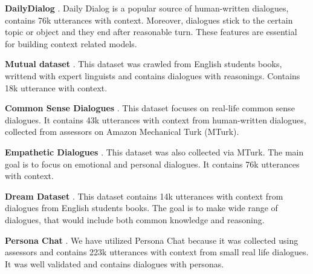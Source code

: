 \documentclass[11pt]{article}
\begin{document}
\textbf{DailyDialog} \cite{Li-Su-2017}. Daily Dialog is a popular source of human-written dialogues, contains 76k utterances with context. Moreover, dialogues stick to the certain topic or object and they end after reasonable turn. These features are essential for building context related models.

\smallskip

\textbf{Mutual dataset} \cite{cui-etal-2020-mutual}. This dataset was crawled from English students books, writtend with expert linguists and contains dialogues with reasonings. Contains 18k utterance with context.

\smallskip

\textbf{Common Sense Dialogues} \cite{Zhou-2021}. This dataset focuses on real-life common sense dialogues. It contains 43k utterances with context from human-written dialogues, collected from assessors on Amazon Mechanical Turk (MTurk).

\smallskip


\textbf{Empathetic Dialogues} \cite{Rashkin-2018}. This dataset was also collected via MTurk. The main goal is to focus on emotional and personal dialogues. It contains 76k utterances with context.

\smallskip

\textbf{Dream Dataset} \cite{Sun-2019}. This dataset contains 14k utterances with context from dialogues from English students books. The goal is to make wide range of dialogues, that would include both common knowledge and reasoning.

\smallskip

\textbf{Persona Chat} \cite{Zhang-2018}. We have utilized Persona Chat because it was collected using assessors and contains 223k utterances with context from small real life dialogues. It was well validated and contains dialogues with personas.
\end{document}
